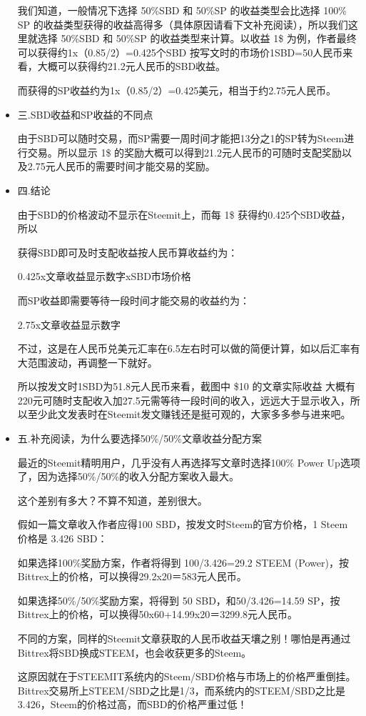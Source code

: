 \documentclass[]{ctexbook}
\begin{document}
\begin{itemize}
  我们知道，一般情况下选择 50\%SBD 和 50\%SP 的收益类型会比选择 100\% SP 的收益类型获得的收益高得多（具体原因请看下文补充阅读），所以我们这里就选择 50\%SBD 和 50\%SP 的收益类型来计算。以收益 1\$ 为例，作者最终可以获得约1x（0.85/2）=0.425个SBD 按写文时的市场价1SBD=50人民币来看，大概可以获得约21.2元人民币的SBD收益。

  而获得的SP收益约为1x（0.85/2）=0.425美元，相当于约2.75元人民币。
\item
  三.SBD收益和SP收益的不同点

  由于SBD可以随时交易，而SP需要一周时间才能把13分之1的SP转为Steem进行交易。所以显示 1\$ 的奖励大概可以得到21.2元人民币的可随时支配奖励以及2.75元人民币的需要时间才能交易的奖励。
\item
  四.结论

  由于SBD的价格波动不显示在Steemit上，而每 1\$ 获得约0.425个SBD收益，所以

  获得SBD即可及时支配收益按人民币算收益约为：

  0.425x文章收益显示数字xSBD市场价格

  而SP收益即需要等待一段时间才能交易的收益约为：

  2.75x文章收益显示数字

  不过，这是在人民币兑美元汇率在6.5左右时可以做的简便计算，如以后汇率有大范围波动，再调整一下就好。

  所以按发文时1SBD为51.8元人民币来看，截图中 \$10 的文章实际收益 大概有220元可随时支配收入加27.5元需等待一段时间的收入，远远大于显示收入，所以至少此文发表时在Steemit发文赚钱还是挺可观的，大家多多参与进来吧。
\item
  五.补充阅读，为什么要选择50\%/50\%文章收益分配方案

  最近的Steemit精明用户，几乎没有人再选择写文章时选择100\% Power Up选项了，因为选择50\%/50\%的收入分配方案收入最大。

  这个差别有多大？不算不知道，差别很大。

  假如一篇文章收入作者应得100 SBD，按发文时Steem的官方价格，1 Steem 价格是 3.426 SBD：

  如果选择100\%奖励方案，作者将得到 100/3.426=29.2 STEEM (Power)，按Bittrex上的价格，可以换得29.2x20＝583元人民币。

  如果选择50\%/50\%奖励方案，将得到 50 SBD，和50/3.426=14.59 SP，按Bittrex上的价格，可以换得50x60+14.99x20＝3299.8元人民币。

  不同的方案，同样的Steemit文章获取的人民币收益天壤之别！哪怕是再通过Bittrex将SBD换成STEEM，也会收获更多的Steem。

  这原因就在于STEEMIT系统内的Steem/SBD价格与市场上的价格严重倒挂。Bittrex交易所上STEEM/SBD之比是1/3，而系统内的STEEM/SBD之比是 3.426，Steem的价格过高，而SBD的价格严重过低！


\end{itemize}
\end{document}
